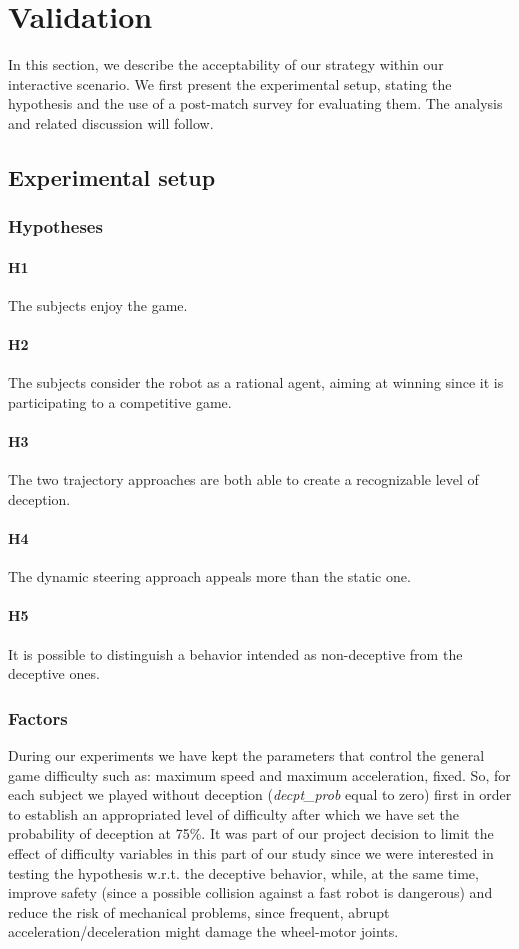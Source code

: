 \section{Validation}
\label{sec:deception_validation}
In this section, we describe the acceptability of our strategy within our interactive scenario. We first present the experimental setup, stating the hypothesis and the use of a post-match survey for evaluating them. The analysis and related discussion will follow. 

\subsection{Experimental setup}
\subsubsection{Hypotheses}

\paragraph{H1} The subjects enjoy the game.
\paragraph{H2} The subjects consider the robot as a rational agent, aiming at winning since it is participating to a competitive game.
\paragraph{H3} The two trajectory approaches are both able to create a recognizable level of deception. 
\paragraph{H4} The dynamic steering approach appeals more than the static one.
\paragraph{H5} It is possible to distinguish a behavior intended as non-deceptive from the deceptive ones.

\subsubsection{Factors}
During our experiments we have kept the parameters that control the general game difficulty such as: maximum speed and maximum acceleration, fixed. So, for each subject we played without deception (\textit{decpt\_prob} equal to zero) first in order to establish an appropriated level of difficulty after which we have set the probability of deception at 75\%. It was part of our project decision to limit the effect of difficulty variables in this part of our study since we were interested in testing the hypothesis w.r.t. the deceptive behavior, while, at the same time, improve safety (since a possible collision against a fast robot is dangerous) and reduce the risk of mechanical problems, since frequent, abrupt acceleration/deceleration might damage the wheel-motor joints.

